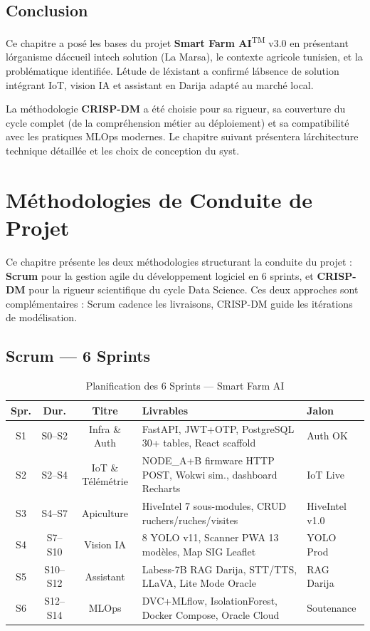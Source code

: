 \documentclass[12pt,a4paper,oneside]{report}
\newcommand{\farmAI}{\textbf{Smart Farm AI}\textsuperscript{TM}}
\begin{document}
\section{Conclusion}

Ce chapitre a pos\'e les bases du projet \farmAI{} v3.0 en pr\'esentant l\'organisme
d\'accueil intech solution (La Marsa), le contexte agricole tunisien, et la
probl\'ematique identifi\'ee. L\'\'etude de l\'existant a confirm\'e l\'absence de solution
int\'egrant IoT, vision IA et assistant en Darija adapt\'e au march\'e local.

La m\'ethodologie \textbf{CRISP-DM} a \'et\'e choisie pour sa rigueur, sa couverture du
cycle complet (de la compr\'ehension m\'etier au d\'eploiement) et sa compatibilit\'e avec
les pratiques MLOps modernes. Le chapitre suivant pr\'esentera l\'architecture technique
d\'etaill\'ee et les choix de conception du syst\eme.


\chapter{Méthodologies de Conduite de Projet}

\noindent Ce chapitre présente les deux méthodologies structurant la conduite du projet :
\textbf{Scrum} pour la gestion agile du développement logiciel en 6 sprints, et
\textbf{CRISP-DM} pour la rigueur scientifique du cycle Data Science. Ces deux
approches sont complémentaires : Scrum cadence les livraisons, CRISP-DM guide
les itérations de modélisation.

\section{Scrum — 6 Sprints}

\begin{table}[H]\centering
\caption{Planification des 6 Sprints — Smart Farm AI}
\label{tab:sprints}
\small
\begin{tabular}{cccp{5.5cm}l}
\toprule
\textbf{Spr.}&\textbf{Dur.}&\textbf{Titre}&\textbf{Livrables}&\textbf{Jalon}\\
\midrule
S1&S0--S2&Infra \& Auth&FastAPI, JWT+OTP, PostgreSQL 30+ tables, React scaffold&Auth OK\\
S2&S2--S4&IoT \& Télémétrie&NODE\_A+B firmware HTTP POST, Wokwi sim., dashboard Recharts&IoT Live\\
S3&S4--S7&Apiculture&HiveIntel 7 sous-modules, CRUD ruchers/ruches/visites&HiveIntel v1.0\\
S4&S7--S10&Vision IA&8 YOLO v11, Scanner PWA 13 modèles, Map SIG Leaflet&YOLO Prod\\
S5&S10--S12&Assistant&Labess-7B RAG Darija, STT/TTS, LLaVA, Lite Mode Oracle&RAG Darija\\
S6&S12--S14&MLOps&DVC+MLflow, IsolationForest, Docker Compose, Oracle Cloud&Soutenance\\
\bottomrule
\end{tabular}
\end{table}
\end{document}
